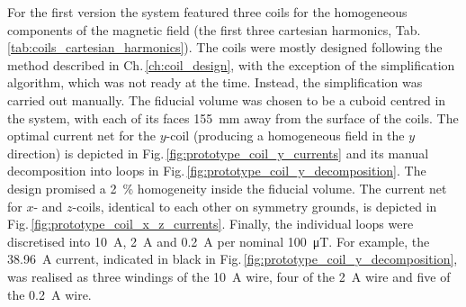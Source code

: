 For the first version the system featured three coils for the homogeneous components of the magnetic field (the first three cartesian harmonics, Tab.\,\ref{tab:coils_cartesian_harmonics}).
The coils were mostly designed following the method described in Ch.\,\ref{ch:coil_design},
with the exception of the simplification algorithm, which was not ready at the time.
Instead, the simplification was carried out manually.
The fiducial volume was chosen to be a cuboid centred in the system, with each of its faces \SI{155}{\milli\meter} away from the surface of the coils.
The optimal current net for the $y$-coil (producing a homogeneous field in the $y$ direction) is depicted in Fig.\,\ref{fig:prototype_coil_y_currents} and its manual decomposition into loops in Fig.\,\ref{fig:prototype_coil_y_decomposition}.
The design promised a \SI{2}{\percent} homogeneity inside the fiducial volume.
The current net for $x$- and $z$-coils, identical to each other on symmetry grounds, is depicted in Fig.\,\ref{fig:prototype_coil_x_z_currents}.
Finally, the individual loops were discretised into \SI{10}{\ampere}, \SI{2}{\ampere} and \SI{0.2}{\ampere} per nominal \SI{100}{\micro\tesla}.
For example, the \SI{38.96}{\ampere} current, indicated in black in Fig.\,\ref{fig:prototype_coil_y_decomposition}, was realised as three windings of the \SI{10}{\ampere} wire, four of the \SI{2}{\ampere} wire and five of the \SI{0.2}{\ampere} wire.

